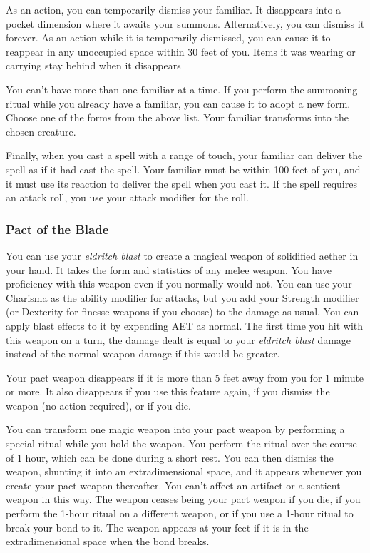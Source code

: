 As an action, you can temporarily dismiss your familiar. It disappears into a pocket dimension where it awaits your summons. Alternatively, you can dismiss it forever. As an action while it is temporarily dismissed, you can cause it to reappear in any unoccupied space within 30 feet of you. Items it was wearing or carrying stay behind when it disappears
    
You can't have more than one familiar at a time. If you perform the summoning ritual while you already have a familiar, you can cause it to adopt a new form. Choose one of the forms from the above list. Your familiar transforms into the chosen creature.
    
Finally, when you cast a spell with a range of touch, your familiar can deliver the spell as if it had cast the spell. Your familiar must be within 100 feet of you, and it must use its reaction to deliver the spell when you cast it. If the spell requires an attack roll, you use your attack modifier for the roll.

\subsubsection{Pact of the Blade}

You can use your \textit{eldritch blast} to create a magical weapon of solidified aether in your hand. It takes the form and statistics of any melee weapon. You have proficiency with this weapon even if you normally would not. You can use your Charisma as the ability modifier for attacks, but you add your Strength modifier (or Dexterity for finesse weapons if you choose) to the damage as usual. You can apply blast effects to it by expending AET as normal. The first time you hit with this weapon on a turn, the damage dealt is equal to your \textit{eldritch blast} damage instead of the normal weapon damage if this would be greater.

Your pact weapon disappears if it is more than 5 feet away from you for 1 minute or more. It also disappears if you use this feature again, if you dismiss the weapon (no action required), or if you die.

You can transform one magic weapon into your pact weapon by performing a special ritual while you hold the weapon. You perform the ritual over the course of 1 hour, which can be done during a short rest. You can then dismiss the weapon, shunting it into an extradimensional space, and it appears whenever you create your pact weapon thereafter. You can't affect an artifact or a sentient weapon in this way. The weapon ceases being your pact weapon if you die, if you perform the 1-hour ritual on a different weapon, or if you use a 1-hour ritual to break your bond to it. The weapon appears at your feet if it is in the extradimensional space when the bond breaks.

